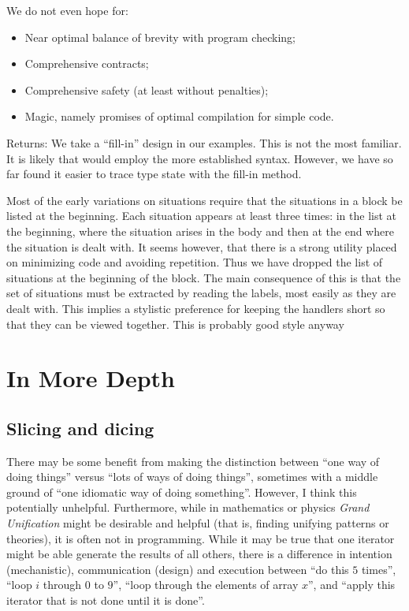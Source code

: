 \documentclass[10pt]{amsart}
\begin{document}
We do not even hope for:
\begin{itemize}
\item Near optimal balance of brevity with program checking;
\item Comprehensive contracts;
\item Comprehensive safety (at least without penalties);
\item Magic, namely promises of optimal compilation for simple code.
\end{itemize}


Returns: We take a ``fill-in'' design in our examples.  This is not
the most familiar.  It is likely that \Utop would employ the more
established syntax.  However, we have so far found it easier to trace
type state with the fill-in method.

Most of the early variations on situations require that the situations
in a block be listed at the beginning.  Each situation appears at
least three times: in the list at the beginning, where the situation
arises in the body and then at the end where the situation is dealt
with.  It seems however, that there is a strong utility placed on
minimizing  code and avoiding repetition.  Thus we have dropped the
list of situations at the beginning of the block.  The main
consequence of this is that the set of situations must be extracted by
reading the labels, most easily as they are dealt with.  This implies
a stylistic preference for keeping the handlers short so that they can
be viewed together.  This is probably good style anyway

\section{In More Depth}

\subsection{Slicing and dicing}

There may be some benefit from making the distinction between ``one
way of doing things'' versus ``lots of ways of doing things'',
sometimes with a middle ground of ``one idiomatic way of doing
something''.  However, I think this potentially unhelpful.
Furthermore, while in mathematics or physics \emph{Grand Unification}
might be desirable and helpful (that is, finding unifying patterns or
theories), it is often not in programming.  While it may be true that
one iterator might be able generate the results of all others, there
is a difference in intention (mechanistic), communication (design) and
execution between ``do this $5$ times'', ``loop $i$ through $0$ to
$9$'', ``loop through the elements of array $x$'', and ``apply this
iterator that is not done until it is done''.
\end{document}
